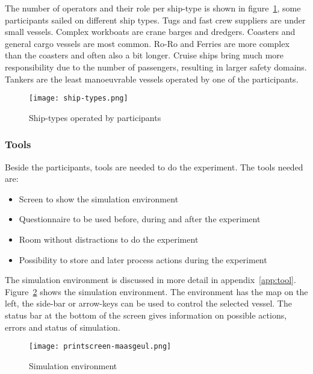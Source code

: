 The number of operators and their role per ship-type is shown in figure~\ref{fig:ship-types}, some participants sailed on different ship types. Tugs and fast crew suppliers are under small vessels. Complex workboats are crane barges and dredgers. Coasters and general cargo vessels are most common. Ro-Ro and Ferries are more complex than the coasters and often also a bit longer. Cruise ships bring much more responsibility due to the number of passengers, resulting in larger safety domains. Tankers are the least manoeuvrable vessels operated by one of the participants.

\begin{figure}[p]
	\centering
	\texttt{[image: ship-types.png]}
	\caption{Ship-types operated by participants}
	\label{fig:ship-types}
\end{figure}

\subsubsection{Tools}
Beside the participants, tools are needed to do the experiment. The tools needed are:
\begin{spacing}{1}
	\begin{itemize}
		\item Screen to show the simulation environment
		\item Questionnaire to be used before, during and after the experiment
		\item Room without distractions to do the experiment
		\item Possibility to store and later process actions during the experiment
	\end{itemize}
\end{spacing}

The simulation environment is discussed in more detail in appendix~\ref{app:tool}. Figure~\ref{fig:printscreen-tool} shows the simulation environment. The environment has the map on the left, the side-bar or arrow-keys can be used to control the selected vessel. The status bar at the bottom of the screen gives information on possible actions, errors and status of simulation.

\begin{figure}[p]
	\centering
	\texttt{[image: printscreen-maasgeul.png]}
	\caption{Simulation environment}
	\label{fig:printscreen-tool}
\end{figure}

